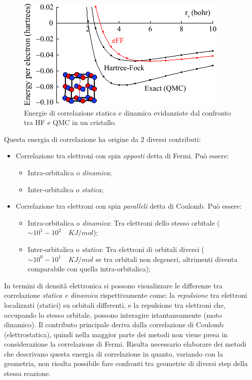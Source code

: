 \documentclass[oneside]{amsbook}
\numberwithin{section}{chapter}
\numberwithin{equation}{section}
\numberwithin{figure}{section}
\begin{document}
\begin{figure}[H]
\centering
\caption{Energie di correlazione statica e dinamica evidanziate dal confronto tra HF e QMC in un cristallo.}\label{C}
\includegraphics[scale=0.5]{corr}
\end{figure}
Questa energia di correlazione ha origine da $2$ diversi contributi:
\begin{itemize}
\item Correlazione tra elettroni con spin \emph{opposti} detta di Fermi. Può essere:
\begin{itemize}
\item Intra-orbitalica o \emph{dinamica};
\item Inter-orbitalica o \emph{statica};
\end{itemize}
\item Correlazione tra elettroni con spin \emph{paralleli} detta di Coulomb. Può essere:
\begin{itemize}
\item Intra-orbitalica o \emph{dinamica}: Tra elettroni dello stesso orbitale ($\sim 10^1-10^2 \quad KJ/mol$);
\item Inter-orbitalica o \emph{statica}: Tra elettroni di orbitali diversi ($\sim 10^0-10^1 \quad KJ/mol$ se tra orbitali non degeneri, altrimenti diventa comparabile con quella intra-orbitalica);
\end{itemize}
\end{itemize}
In termini di densità elettronica si possono visualizzare le differenze tra  correlazione \emph{statica e dinamica}   rispettivamente come: la \emph{repulsione} tra elettroni localizzati (statici) su orbitali differenti, e la repulsione tra elettroni che, occupando lo stesso orbitale, possono interagire istantaneamente (moto dinamico).
Il contributo principale deriva dalla correlazione di Coulomb (elettrostatica), quindi nella maggior parte dei metodi non viene presa in considerazione la correlazione di Fermi.
Risulta necessario elaborare dei metodi che descrivano questa energia di correlazione in quanto, variando con la geometria, non risulta possibile fare confronti tra geometrie di diversi step della stessa reazione.
\end{document}
